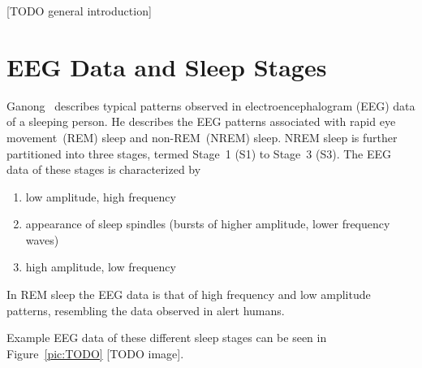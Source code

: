 [TODO general introduction]


\section{EEG Data and Sleep Stages}
\label{sec:eeg_data_and_sleep_stages}

Ganong~\cite{Ganong1997} describes typical patterns observed in electroencephalogram (EEG) data of a sleeping person. He describes the EEG patterns associated with rapid eye movement~(REM) sleep and non-REM~(NREM) sleep. NREM sleep is further partitioned into three stages, termed Stage~1 (S1) to Stage~3 (S3). The EEG data of these stages is characterized by

\begin{enumerate}[label={S\arabic*:}]
	\item low amplitude, high frequency
	\item appearance of sleep spindles (bursts of higher amplitude, lower frequency waves)
	\item high amplitude, low frequency
\end{enumerate}

\noindent
In REM sleep the EEG data is that of high frequency and low amplitude patterns, resembling the data observed in alert humans.

Example EEG data of these different sleep stages can be seen in Figure~\ref{pic:TODO} [TODO image].